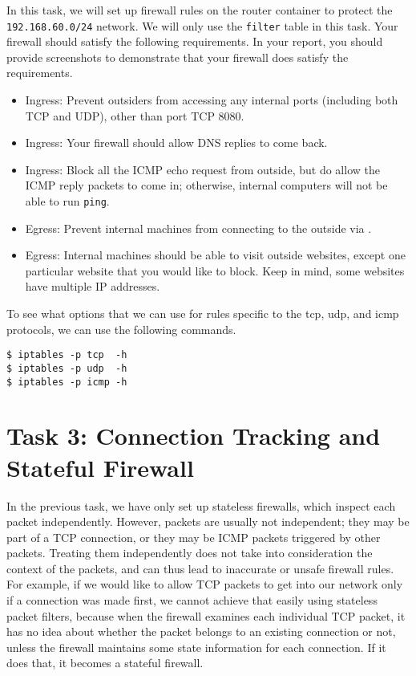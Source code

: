 In this task, we will set up firewall rules on the router container
to protect the \texttt{192.168.60.0/24} network. We will only use 
the \texttt{filter} table in this task.  
Your firewall should satisfy the following requirements. 
In your report, you should provide screenshots to demonstrate 
that your firewall does satisfy the requirements.


\begin{itemize}
\item Ingress: Prevent outsiders from accessing any internal ports (including
both TCP and UDP), other than port TCP 8080. 
 
\item Ingress: Your firewall should allow DNS replies to come back. 

\item Ingress: Block all the ICMP echo request from outside, but 
do allow the ICMP reply packets to come in; otherwise, internal 
computers will not be able to run \texttt{ping}.  

\item Egress: Prevent internal machines from connecting to the outside 
      via \telnet.

\item Egress: Internal machines should be able to visit outside websites, 
except one particular website that you would like to block. Keep in mind, 
some websites have multiple IP addresses. 

\end{itemize}


To see what options that we can use for rules specific to the tcp, udp, and 
icmp protocols, we can use the following commands. 

\begin{lstlisting}
$ iptables -p tcp  -h
$ iptables -p udp  -h
$ iptables -p icmp -h
\end{lstlisting}
 




\section{Task 3: Connection Tracking and Stateful Firewall}


In the previous task, we have only set up stateless firewalls, which inspect each
packet independently. However, packets
are usually not independent; they may be part of a TCP connection,
or they may be ICMP packets triggered by other packets. Treating them
independently does not take into consideration the context of the
packets, and can thus lead to inaccurate or unsafe firewall rules.
For example, if we would like to allow TCP packets to get into our network
only if a connection was made first, we cannot achieve that easily 
using stateless packet filters, because when the firewall examines each individual TCP packet,
it has no idea about whether the packet belongs to an existing connection
or not, unless the firewall maintains some state information for each connection.
If it does that, it becomes a stateful firewall.


